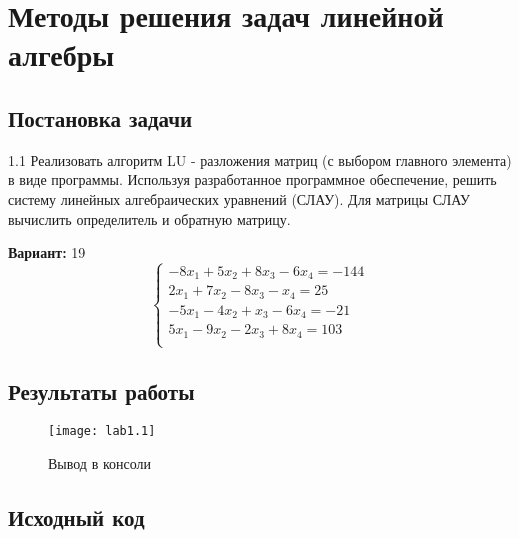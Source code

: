 \section{Методы решения задач линейной алгебры}

\subsection{Постановка задачи}
1.1 Реализовать алгоритм LU -  разложения матриц (с выбором главного элемента) в виде программы. Используя разработанное программное обеспечение, решить систему линейных алгебраических уравнений (СЛАУ). Для матрицы СЛАУ вычислить определитель и обратную матрицу.

{\bfseries Вариант:} 19
\begin{equation}
        \left\{ 
        \begin{array}{ll} 
        -8x_1 + 5x_2 + 8x_3 -6x_4 = -144 \\
        2x_1 + 7x_2 - 8x_3 - x_4 = 25\\
        -5x_1 - 4x_2 + x_3 - 6x_4 = -21\\
        5x_1 - 9x_2 - 2x_3 + 8x_4 = 103\\
        \end{array}\right.
\end{equation}
\pagebreak

\subsection{Результаты работы}

\begin{figure}[h!]
\centering
\texttt{[image: lab1.1]}
\caption{Вывод в консоли}
\end{figure}
\pagebreak

\vfill

\subsection{Исходный код}


\pagebreak
